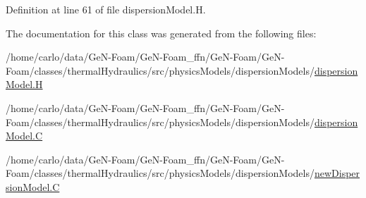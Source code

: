 Definition at line 61 of file dispersion\+Model.\+H.



The documentation for this class was generated from the following files\+:\begin{DoxyCompactItemize}
\item 
/home/carlo/data/\+Ge\+N-\/\+Foam/\+Ge\+N-\/\+Foam\+\_\+ffn/\+Ge\+N-\/\+Foam/\+Ge\+N-\/\+Foam/classes/thermal\+Hydraulics/src/physics\+Models/dispersion\+Models/\hyperlink{dispersionModel_8H}{dispersion\+Model.\+H}\item 
/home/carlo/data/\+Ge\+N-\/\+Foam/\+Ge\+N-\/\+Foam\+\_\+ffn/\+Ge\+N-\/\+Foam/\+Ge\+N-\/\+Foam/classes/thermal\+Hydraulics/src/physics\+Models/dispersion\+Models/\hyperlink{dispersionModel_8C}{dispersion\+Model.\+C}\item 
/home/carlo/data/\+Ge\+N-\/\+Foam/\+Ge\+N-\/\+Foam\+\_\+ffn/\+Ge\+N-\/\+Foam/\+Ge\+N-\/\+Foam/classes/thermal\+Hydraulics/src/physics\+Models/dispersion\+Models/\hyperlink{newDispersionModel_8C}{new\+Dispersion\+Model.\+C}\end{DoxyCompactItemize}
